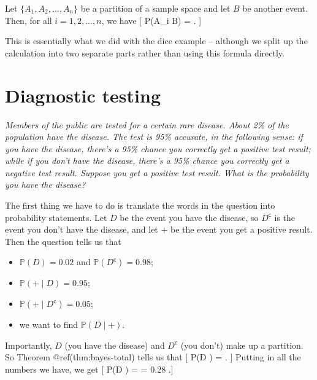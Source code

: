 \documentclass[
  letterpaper,
  DIV=11,
  numbers=noendperiod]{scrreprt}
\providecommand{\tightlist}{%
  \setlength{\itemsep}{0pt}\setlength{\parskip}{0pt}}\usepackage{longtable,booktabs,array}
\theoremstyle{remark}
\begin{document}
\leavevmode{}%
Let \(\{A_1, A_2, \dots, A_n\}\) be a partition of a sample space and
let \(B\) be another event. Then, for all \(i=1,2,\dots,n\), we have {[}
\mathbb P(A\_i \mid B) =
. {]}

This is essentially what we did with the dice example -- although we
split up the calculation into two separate parts rather than using this
formula directly.

\hypertarget{screening}{%
\section{Diagnostic testing}\label{screening}}

\emph{Members of the public are tested for a certain rare disease. About
2\% of the population have the disease. The test is 95\% accurate, in
the following sense: if you have the disease, there's a 95\% chance you
correctly get a positive test result; while if you don't have the
disease, there's a 95\% chance you correctly get a negative test result.
Suppose you get a positive test result. What is the probability you have
the disease?}

The first thing we have to do is translate the words in the question
into probability statements. Let \(D\) be the event you have the
disease, so \(D^\mathsf{c}\) is the event you don't have the disease,
and let \(+\) be the event you get a positive result. Then the question
tells us that

\begin{itemize}
\tightlist
\item
  \(\mathbb P(D) = 0.02\) and \(\mathbb P(D^\mathsf{c}) = 0.98\);
\item
  \(\mathbb P({+} \mid D) = 0.95\);
\item
  \(\mathbb P({+}\mid D^\mathsf{c}) = 0.05\);
\item
  we want to find \(\mathbb P(D \mid {+})\).
\end{itemize}

Importantly, \(D\) (you have the disease) and \(D^\mathsf{c}\) (you
don't) make up a partition. So Theorem @ref(thm:bayes-total) tells us
that {[} \mathbb P(D \mid {+}) =
. {]} Putting in all the numbers we have, we get {[} \mathbb P(D
\mid {+}) = 
= 0.28 .{]}
\end{document}

